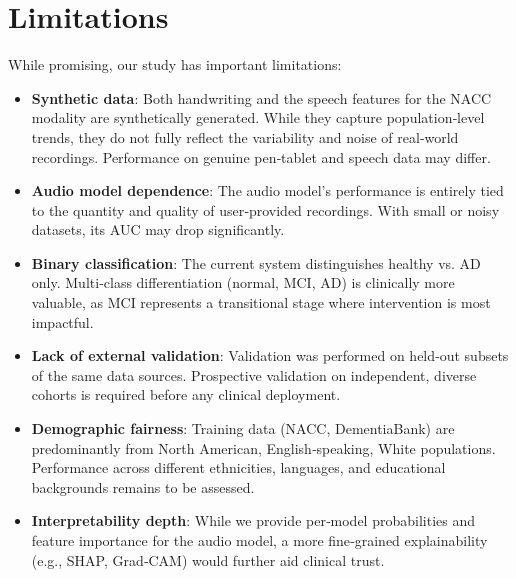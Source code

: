 \documentclass[conference]{IEEEtran}
\begin{document}
\section{Limitations}
While promising, our study has important limitations:
\begin{itemize}
  \item \textbf{Synthetic data}: Both handwriting and the speech features for the NACC modality are synthetically generated. While they capture population‑level trends, they do not fully reflect the variability and noise of real‑world recordings. Performance on genuine pen‑tablet and speech data may differ.
  \item \textbf{Audio model dependence}: The audio model's performance is entirely tied to the quantity and quality of user‑provided recordings. With small or noisy datasets, its AUC may drop significantly.
  \item \textbf{Binary classification}: The current system distinguishes healthy vs. AD only. Multi‑class differentiation (normal, MCI, AD) is clinically more valuable, as MCI represents a transitional stage where intervention is most impactful.
  \item \textbf{Lack of external validation}: Validation was performed on held‑out subsets of the same data sources. Prospective validation on independent, diverse cohorts is required before any clinical deployment.
  \item \textbf{Demographic fairness}: Training data (NACC, DementiaBank) are predominantly from North American, English‑speaking, White populations. Performance across different ethnicities, languages, and educational backgrounds remains to be assessed.
  \item \textbf{Interpretability depth}: While we provide per‑model probabilities and feature importance for the audio model, a more fine‑grained explainability (e.g., SHAP, Grad‑CAM) would further aid clinical trust.
\end{itemize}

\end{document}
